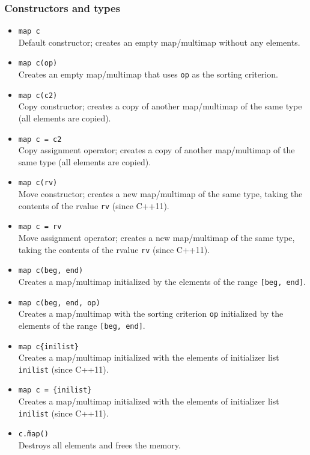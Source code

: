 \documentclass{report}
\begin{document}
\subsubsection{Constructors and types}
\bigbreak \noindent \bigbreak \noindent 
\begin{itemize}
    \item \texttt{map c} \\
    Default constructor; creates an empty map/multimap without any elements.
    
    \item \texttt{map c(op)} \\
    Creates an empty map/multimap that uses \texttt{op} as the sorting criterion.
    
    \item \texttt{map c(c2)} \\
    Copy constructor; creates a copy of another map/multimap of the same type (all elements are copied).
    
    \item \texttt{map c = c2} \\
    Copy assignment operator; creates a copy of another map/multimap of the same type (all elements are copied).
    
    \item \texttt{map c(rv)} \\
    Move constructor; creates a new map/multimap of the same type, taking the contents of the rvalue \texttt{rv} (since C++11).
    
    \item \texttt{map c = rv} \\
    Move assignment operator; creates a new map/multimap of the same type, taking the contents of the rvalue \texttt{rv} (since C++11).
    
    \item \texttt{map c(beg, end)} \\
    Creates a map/multimap initialized by the elements of the range \texttt{[beg, end]}.
    
    \item \texttt{map c(beg, end, op)} \\
    Creates a map/multimap with the sorting criterion \texttt{op} initialized by the elements of the range \texttt{[beg, end]}.
    
    \item \texttt{map c\{inilist\}} \\
    Creates a map/multimap initialized with the elements of initializer list \texttt{inilist} (since C++11).
    
    \item \texttt{map c = \{inilist\}} \\
    Creates a map/multimap initialized with the elements of initializer list \texttt{inilist} (since C++11).
    
    \item \texttt{c.\~map()} \\
    Destroys all elements and frees the memory.
\end{itemize}
\end{document}
